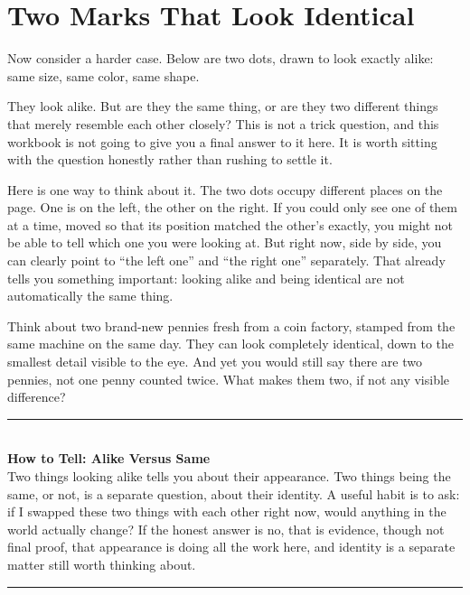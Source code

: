 \documentclass[11pt]{book}
\newenvironment{algorithmproc}[1]{%
\vspace{0.6em}\noindent\rule{\linewidth}{0.6pt}\\[0.2em]\textbf{How to Tell: #1}\\[0.3em]}%
{\\[0.2em]\noindent\rule{\linewidth}{0.6pt}\vspace{0.6em}}
\begin{document}
\section{Two Marks That Look Identical}

Now consider a harder case. Below are two dots, drawn to look exactly alike: same size, same color, same shape.

\begin{center}
\end{center}

They look alike. But are they the same thing, or are they two different things that merely resemble each other closely? This is not a trick question, and this workbook is not going to give you a final answer to it here. It is worth sitting with the question honestly rather than rushing to settle it.

Here is one way to think about it. The two dots occupy different places on the page. One is on the left, the other on the right. If you could only see one of them at a time, moved so that its position matched the other's exactly, you might not be able to tell which one you were looking at. But right now, side by side, you can clearly point to ``the left one'' and ``the right one'' separately. That already tells you something important: looking alike and being identical are not automatically the same thing.

Think about two brand-new pennies fresh from a coin factory, stamped from the same machine on the same day. They can look completely identical, down to the smallest detail visible to the eye. And yet you would still say there are two pennies, not one penny counted twice. What makes them two, if not any visible difference?

\begin{algorithmproc}{Alike Versus Same}
Two things looking alike tells you about their appearance. Two things being the same, or not, is a separate question, about their identity. A useful habit is to ask: if I swapped these two things with each other right now, would anything in the world actually change? If the honest answer is no, that is evidence, though not final proof, that appearance is doing all the work here, and identity is a separate matter still worth thinking about.
\end{algorithmproc}
\end{document}
